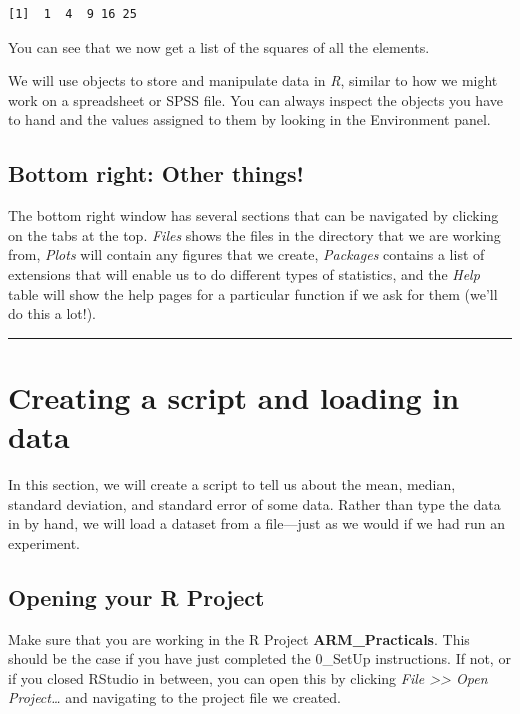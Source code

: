 \documentclass[
  a4paper,
  DIV=11,
  numbers=noendperiod]{scrreprt}
\begin{document}
\begin{verbatim}
[1]  1  4  9 16 25
\end{verbatim}

You can see that we now get a list of the squares of all the elements.

We will use objects to store and manipulate data in \emph{R}, similar to
how we might work on a spreadsheet or SPSS file. You can always inspect
the objects you have to hand and the values assigned to them by looking
in the Environment panel.

\section{Bottom right: Other things!}\label{bottom-right-other-things}

The bottom right window has several sections that can be navigated by
clicking on the tabs at the top. \emph{Files} shows the files in the
directory that we are working from, \emph{Plots} will contain any
figures that we create, \emph{Packages} contains a list of extensions
that will enable us to do different types of statistics, and the
\emph{Help} table will show the help pages for a particular function if
we ask for them (we'll do this a lot!).

\begin{center}\rule{0.5\linewidth}{0.5pt}\end{center}

\chapter{Creating a script and loading in
data}\label{creating-a-script-and-loading-in-data}

In this section, we will create a script to tell us about the mean,
median, standard deviation, and standard error of some data. Rather than
type the data in by hand, we will load a dataset from a file---just as
we would if we had run an experiment.

\section{Opening your R Project}\label{opening-your-r-project}

Make sure that you are working in the R Project
\textbf{ARM\_Practicals}. This should be the case if you have just
completed the 0\_SetUp instructions. If not, or if you closed RStudio in
between, you can open this by clicking \emph{File
\textgreater\textgreater{} Open Project\ldots{}} and navigating to the
project file we created.
\end{document}
